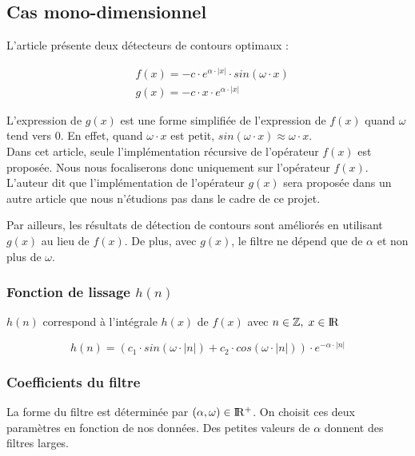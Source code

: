 \subsection{Cas mono-dimensionnel}

L'article présente deux détecteurs de contours optimaux :

\begin{align*}
& f(x) = -c \cdot e^{\alpha \cdot |x|} \cdot sin(\omega \cdot x) \\
& g(x) = -c \cdot x \cdot e^{\alpha \cdot |x|}
\end{align*}

L'expression de $ g(x) $ est une forme simplifiée de l'expression de $ f(x) $ quand $ \omega $ tend vers $ 0 $. En effet, quand $ \omega \cdot x $ est petit, $ sin(\omega \cdot x) \approx \omega \cdot x $. \\

Dans cet article, seule l'implémentation récursive de l'opérateur $ f(x) $ est proposée. Nous nous focaliserons donc uniquement sur l'opérateur $ f(x) $. L'auteur dit que l'implémentation de l'opérateur $ g(x) $ sera proposée dans un autre article que nous n'étudions pas dans le cadre de ce projet.

Par ailleurs, les résultats de détection de contours sont améliorés en utilisant $ g(x) $ au lieu de $ f(x) $. De plus, avec $ g(x) $, le filtre ne dépend que de $ \alpha $ et non plus de $ \omega $.

\subsubsection{Fonction de lissage $ h(n) $}

$ h(n) $ correspond à l’intégrale $ h(x) $ de $ f(x) $ avec $ n \in \mathbb{Z}, \; x \in \rm I\!R $

\[ h(n) = (c_1 \cdot sin(\omega \cdot |n|) + c_2 \cdot cos(\omega \cdot |n|)) \cdot e^{-\alpha \cdot |n|} \]

\subsubsection{Coefficients du filtre}

La forme du filtre est déterminée par $ (\alpha, \omega) \in \rm I\!R^+ $. On choisit ces deux paramètres en fonction de nos données. Des petites valeurs de $ \alpha $ donnent des filtres larges.


